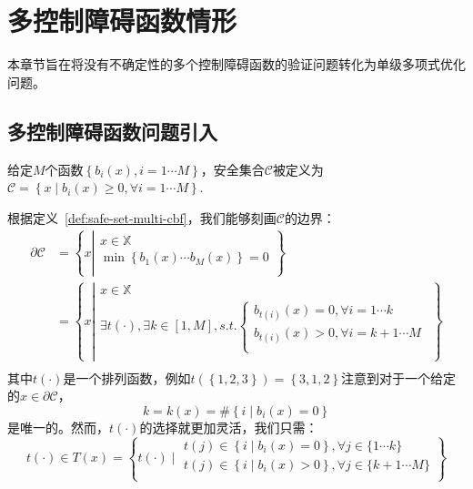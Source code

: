 
\chapter{多控制障碍函数情形}

本章节旨在将没有不确定性的多个控制障碍函数的验证问题转化为单级多项式优化问题。

\section{多控制障碍函数问题引入}
\begin{definition}[多控制障碍函数安全集合定义] \label{def:safe-set-multi-cbf}
给定$M$个函数$\left\{ b_i(x),i=1\cdots M \right\} $，安全集合$\mathcal{C}$被定义为$\mathcal{C} =\left\{ x\mid b_i\left( x \right) \ge 0,\forall i=1\cdots M \right\} $. 
\end{definition}

根据定义~\ref{def:safe-set-multi-cbf}，我们能够刻画$\mathcal{C}$的边界：
\begin{equation}    \label{eq:safe-set-boundary-multi-cbf}
\begin{aligned}
	\partial \mathcal{C} &=\left\{ x\left| \begin{array}{c}
	x\in \mathbb{X}\\
	\min \left\{ b_1\left( x \right) \cdots b_M\left( x \right) \right\} =0\\
\end{array} \right. \right\}\\
	&=\left\{ x\left| \begin{array}{c}
	x\in \mathbb{X}\\
	\exists t\left( \cdot \right) ,\exists k\in \left[ 1,M \right] , s.t.\begin{cases}
	b_{t\left( i \right)}\left( x \right) =0,\forall i=1\cdots k\\
	b_{t\left( i \right)}\left( x \right) >0,\forall i=k+1\cdots M\\
\end{cases}\\
\end{array} \right. \right\}\\
\end{aligned}
\end{equation}
其中$t(\cdot)$是一个排列函数，例如$t\left( \left\{ 1,2,3 \right\} \right) =\left\{ 3,1,2 \right\} $注意到对于一个给定的$x \in \partial \mathcal{C}$，
\begin{equation}    \label{eq:k-multi-cbf}
k=k\left( x \right) =\#\left\{ i\mid b_i(x)=0 \right\} 
\end{equation}
是唯一的。然而，$t(\cdot)$的选择就更加灵活，我们只需：
\begin{equation}    \label{eq:t-multi-cbf}
t(\cdot )\in T\left( x \right) =\left\{ t(\cdot )\mid \begin{array}{c}
	t(j)\in \left\{ i\mid b_i(x)=0 \right\} ,\forall j\in \{1\cdots k\}\\
	t(j)\in \left\{ i\mid b_i(x)>0 \right\} ,\forall j\in \{k+1\cdots M\}\\
\end{array} \right\} 
\end{equation}

